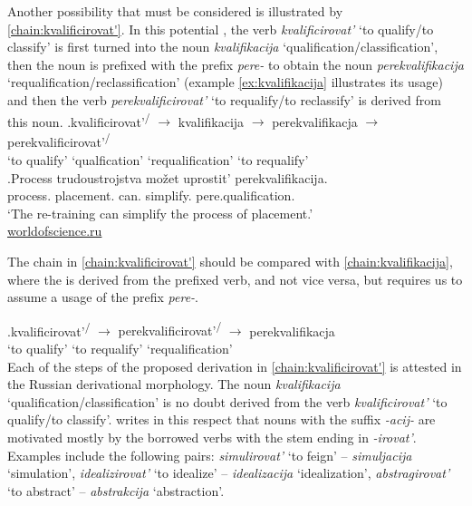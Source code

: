 Another possibility that must be considered is illustrated by \ref{chain:kvalificirovat'}. In this potential , the verb \textit{kvalificirovat'} `to qualify/to classify' is first turned into the noun \textit{kvalifikacija} `qualification\slash classification', then the noun is prefixed with the prefix \textit{pere-} to obtain the noun \textit{perekvalifikacija}  `requalification/reclassification' (example \ref{ex:kvalifikacija} illustrates its usage) and then the verb \textit{perekvalificirovat'} `to requalify/to reclassify' is derived from this noun. 
\exg.\label{chain:kvalificirovat'}kvalificirovat'\textsuperscript{\PF\slash\IPF} {$\rightarrow$} kvalifikacija {$\rightarrow$} perekvalifikacja {$\rightarrow$} {perekvalificirovat'\textsuperscript{\PF\slash\IPF}}\\
{`to qualify'} {} {`qualfication'} {} {`requalification'} {} {`to requalify'}\\

\exg.\label{ex:kvalifikacija}Process trudoustrojstva mo\v{z}et uprostit' perekvalifikacija.\\
process. placement. can. simplify. pere.qualification.\\
\trans `The re-training can simplify the process of placement.'\\\hbox{}\hfill\hbox{\url{worldofscience.ru}}

The chain in \ref{chain:kvalificirovat'} should be compared with \ref{chain:kvalifikacija}, where the  is derived from the prefixed verb, and not vice versa, but requires us to assume a  usage of the prefix \textit{pere-}.

\exg.\label{chain:kvalifikacija}kvalificirovat'\textsuperscript{\PF\slash\IPF} {$\rightarrow$} {perekvalificirovat'\textsuperscript{\PF\slash\IPF}} {$\rightarrow$} perekvalifikacja\\
{`to qualify'} {} {`to requalify'} {} {`requalification'}\\

Each of the steps of the proposed derivation in \ref{chain:kvalificirovat'} is attested in the Russian derivational morphology. The noun \textit{kvalifikacija} `qualification\slash classification' is no doubt derived from the verb \textit{kvalificirovat'} `to qualify/to classify'. \citet{Shvedova:82} writes in this respect that nouns with the suffix \textit{-acij-} are motivated mostly by the borrowed verbs with the stem ending in \textit{-irovat'}. Examples \citep[taken from][159]{Shvedova:82} include the following pairs: \textit{simulirovat'} `to feign' -- \textit{simuljacija} `simulation', \textit{idealizirovat'} `to idealize'  -- \textit{idealizacija} `idealization', \textit{abstragirovat'} `to abstract' -- \textit{abstrakcija} `abstraction'.

